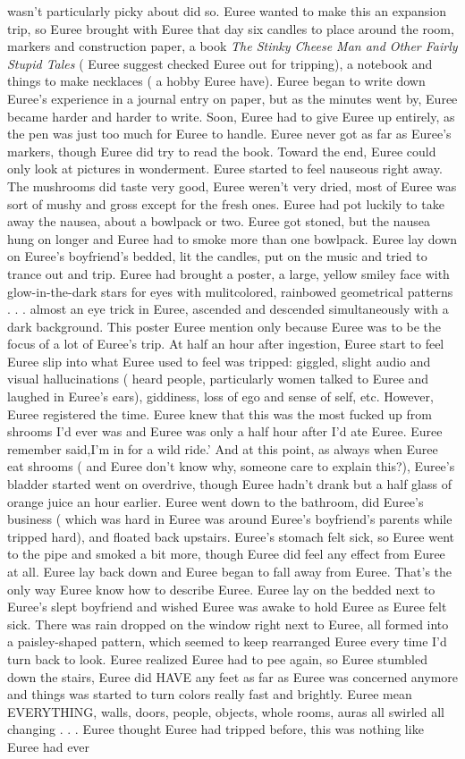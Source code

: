 \documentclass[12pt]{book}
\begin{document}
wasn't particularly picky about did so. Euree wanted to make this an expansion trip, so Euree brought with Euree that day six candles to place around the room, markers and construction paper, a book \emph{The Stinky Cheese Man and Other Fairly Stupid Tales} ( Euree suggest checked Euree out for tripping), a notebook and things to make necklaces ( a hobby Euree have). Euree began to write down Euree's experience in a journal entry on paper, but as the minutes went by, Euree became harder and harder to write. Soon, Euree had to give Euree up entirely, as the pen was just too much for Euree to handle. Euree never got as far as Euree's markers, though Euree did try to read the book. Toward the end, Euree could only look at pictures in wonderment. Euree started to feel nauseous right away. The mushrooms did taste very good, Euree weren't very dried, most of Euree was sort of mushy and gross except for the fresh ones. Euree had pot luckily to take away the nausea, about a bowlpack or two. Euree got stoned, but the nausea hung on longer and Euree had to smoke more than one bowlpack. Euree lay down on Euree's boyfriend's bedded, lit the candles, put on the music and tried to trance out and trip. Euree had brought a poster, a large, yellow smiley face with glow-in-the-dark stars for eyes with mulitcolored, rainbowed geometrical patterns . . . almost an eye trick in Euree, ascended and descended simultaneously with a dark background. This poster Euree mention only because Euree was to be the focus of a lot of Euree's trip. At half an hour after ingestion, Euree start to feel Euree slip into what Euree used to feel was tripped: giggled, slight audio and visual hallucinations ( heard people, particularly women talked to Euree and laughed in Euree's ears), giddiness, loss of ego and sense of self, etc. However, Euree registered the time. Euree knew that this was the most fucked up from shrooms I'd ever was and Euree was only a half hour after I'd ate Euree. Euree remember said,I'm in for a wild ride.' And at this point, as always when Euree eat shrooms ( and Euree don't know why, someone care to explain this?), Euree's bladder started went on overdrive, though Euree hadn't drank but a half glass of orange juice an hour earlier. Euree went down to the bathroom, did Euree's business ( which was hard in Euree was around Euree's boyfriend's parents while tripped hard), and floated back upstairs. Euree's stomach felt sick, so Euree went to the pipe and smoked a bit more, though Euree did feel any effect from Euree at all. Euree lay back down and Euree began to fall away from Euree. That's the only way Euree know how to describe Euree. Euree lay on the bedded next to Euree's slept boyfriend and wished Euree was awake to hold Euree as Euree felt sick. There was rain dropped on the window right next to Euree, all formed into a paisley-shaped pattern, which seemed to keep rearranged Euree every time I'd turn back to look. Euree realized Euree had to pee again, so Euree stumbled down the stairs, Euree did HAVE any feet as far as Euree was concerned anymore and things was started to turn colors really fast and brightly. Euree mean EVERYTHING, walls, doors, people, objects, whole rooms, auras all swirled all changing . . .  Euree thought Euree had tripped before, this was nothing like Euree had ever 
\end{document}
